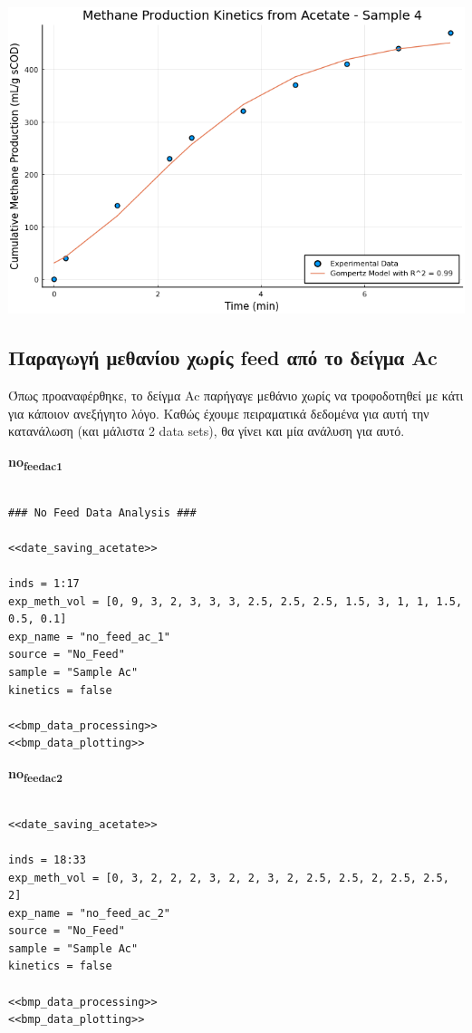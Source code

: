 \documentclass[11pt]{article}
\begin{document}
\begin{center}
\includegraphics[width=.9\linewidth]{../plots/BMPs/Acetate/methane_kinetics_acet_test_4.png}
\end{center}

\subsection{Παραγωγή μεθανίου χωρίς feed από το δείγμα Ac}
\label{sec:org18b7b2c}
Όπως προαναφέρθηκε, το δείγμα Ac παρήγαγε μεθάνιο χωρίς να τροφοδοτηθεί με κάτι για κάποιον ανεξήγητο λόγο. Καθώς έχουμε πειραματικά δεδομένα για αυτή την κατανάλωση (και μάλιστα 2 data sets), θα γίνει και μία ανάλυση για αυτό.

\textbf{no\textsubscript{feed}\textsubscript{ac}\textsubscript{1}}
\begin{verbatim}

### No Feed Data Analysis ###

<<date_saving_acetate>>

inds = 1:17
exp_meth_vol = [0, 9, 3, 2, 3, 3, 3, 2.5, 2.5, 2.5, 1.5, 3, 1, 1, 1.5, 0.5, 0.1]
exp_name = "no_feed_ac_1"
source = "No_Feed"
sample = "Sample Ac"
kinetics = false

<<bmp_data_processing>>
<<bmp_data_plotting>>
\end{verbatim}

\textbf{no\textsubscript{feed}\textsubscript{ac}\textsubscript{2}}
\begin{verbatim}

<<date_saving_acetate>>

inds = 18:33
exp_meth_vol = [0, 3, 2, 2, 2, 3, 2, 2, 3, 2, 2.5, 2.5, 2, 2.5, 2.5, 2]
exp_name = "no_feed_ac_2"
source = "No_Feed"
sample = "Sample Ac"
kinetics = false

<<bmp_data_processing>>
<<bmp_data_plotting>>
\end{verbatim}
\end{document}
